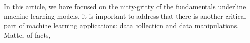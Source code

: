 In this article, we have focused on the nitty-gritty of the fundamentals underline machine learning models, it is important to address that there is another critical part of machine learning applications: data collection and data manipulations. Matter of facts,  